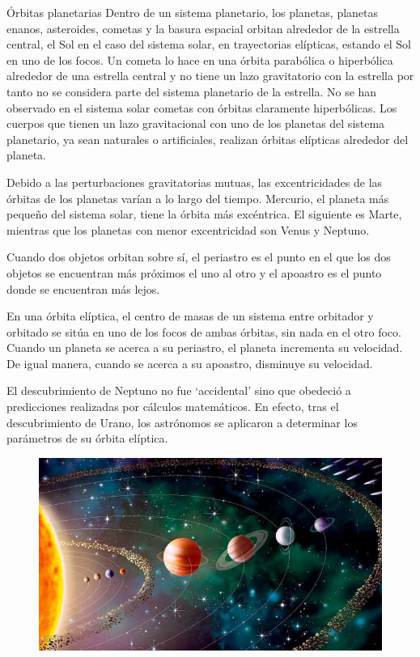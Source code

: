  
\newpage %
\begin{myblock}{Órbitas planetarias}
Dentro de un sistema planetario, los planetas, planetas enanos, asteroides, cometas y la basura espacial orbitan alrededor de la estrella central, el Sol en el caso del sistema solar, en trayectorias elípticas, estando el Sol en uno de los focos. Un cometa lo hace en una órbita parabólica o hiperbólica alrededor de una estrella central y no tiene un lazo gravitatorio con la estrella por tanto no se considera parte del sistema planetario de la estrella. No se han observado en el sistema solar cometas con órbitas claramente hiperbólicas. Los cuerpos que tienen un lazo gravitacional con uno de los planetas del sistema planetario, ya sean naturales o artificiales, realizan órbitas elípticas alrededor del planeta.

\vspace{2mm} Debido a las perturbaciones gravitatorias mutuas, las excentricidades de las órbitas de los planetas varían a lo largo del tiempo. Mercurio, el planeta más pequeño del sistema solar, tiene la órbita más excéntrica. El siguiente es Marte, mientras que los planetas con menor excentricidad son Venus y Neptuno.

\vspace{2mm} Cuando dos objetos orbitan sobre sí, el periastro es el punto en el que los dos objetos se encuentran más próximos el uno al otro y el apoastro es el punto donde se encuentran más lejos.

\vspace{2mm} En una órbita elíptica, el centro de masas de un sistema entre orbitador y orbitado se sitúa en uno de los focos de ambas órbitas, sin nada en el otro foco. Cuando un planeta se acerca a su periastro, el planeta incrementa su velocidad. De igual manera, cuando se acerca a su apoastro, disminuye su velocidad.	

\vspace{2mm} El descubrimiento de Neptuno no fue `accidental’ sino que obedeció a predicciones realizadas por cálculos matemáticos. En efecto, tras el descubrimiento de Urano, los astrónomos se aplicaron a determinar los parámetros de su órbita elíptica.

\begin{figure}[H]
	\centering
	\includegraphics[width=1\textwidth]{imagenes/imagenes15/T15IM04.png}
\end{figure}


\end{myblock}
